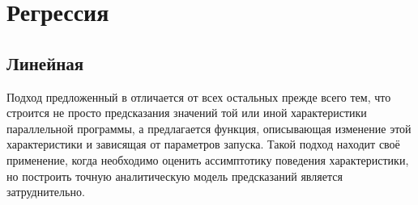 	\section{Регрессия}
		\subsection{Линейная}

Подход предложенный в \cite{analytic_func} отличается от всех остальных прежде всего тем, что строится не просто предсказания значений той или иной характеристики параллельной программы, а предлагается функция, описывающая изменение этой характеристики и зависящая от параметров запуска. Такой подход находит своё применение, когда необходимо оценить ассимптотику поведения характеристики, но построить точную аналитическую модель предсказаний является затруднительно.%
	

